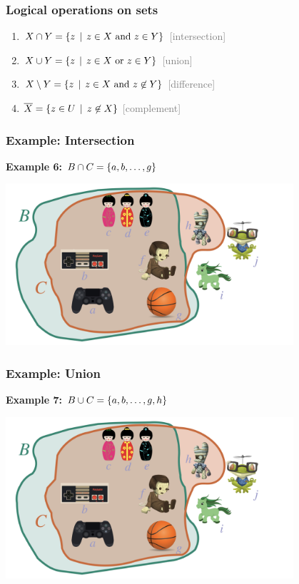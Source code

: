 \documentclass[fleqn,10pt,serif,xcolor=svgnames,xcolor=table,aspectratio=169]{beamer}
\newcommand{\mygray}[1]{\textcolor{gray}{#1}}
\begin{document}
\begin{frame}
  \frametitle{Logical operations on sets}
\begin{enumerate}[]
\item $X \cap Y = \left\{z \thinspace \mid \thinspace z \in X \text{ and } z \in Y\right\}$ \hfill \mygray{[intersection]}
\item $X \cup Y = \left\{z \thinspace \mid \thinspace z \in X \text{ or } z \in Y\right\}$ \hfill \mygray{[union]}
\item $X \setminus Y = \left\{z \thinspace \mid \thinspace z \in X \text{ and } z \not \in Y\right\}$ \hfill
  \mygray{[difference]}
\item $\overline{X} = \left\{z \in U \thinspace \mid \thinspace z \not \in X \right\}$ \hfill
  \mygray{[complement]}
\end{enumerate}

\end{frame}

\begin{frame}
  \frametitle{Example: Intersection}

  \hfill \textbf{Example 6: $B \cap C = \left\{a, b , \dots, g\right\}$}

  \bigskip

  \hfill \includegraphics[width = 0.8\textwidth]{01b-sets-relations-operations/01b-sets-relations-operations-002.jpeg}

\end{frame}

\begin{frame}
  \frametitle{Example: Union}

  \hfill \textbf{Example 7: $B \cup C = \left\{a, b , \dots, g, h\right\}$}

  \bigskip

  \hfill \includegraphics[width = 0.8\textwidth]{01b-sets-relations-operations/01b-sets-relations-operations-002.jpeg}

\end{frame}
\end{document}
